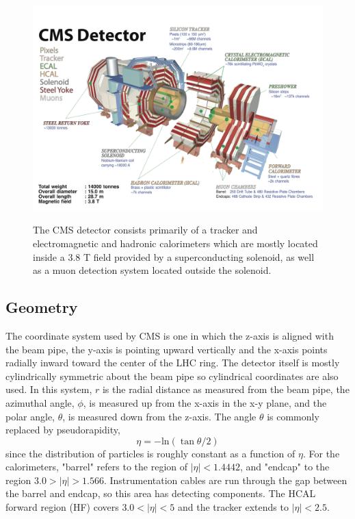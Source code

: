 \begin{figure}[tb]
\caption[The CMS Detector]{
 The CMS detector consists primarily of a tracker
  and electromagnetic and hadronic calorimeters
  which are mostly located inside a 3.8 T field provided
  by a superconducting solenoid,
  as well as a muon detection system located 
  outside the solenoid.
 }
\includegraphics[width=\textwidth]{pdfs/experiment/cms_explode.pdf}
\label{fig:cms_explode}
\end{figure}


 \subsection{Geometry} 
The coordinate system used by CMS is one in
 which the z-axis is aligned with the beam pipe,
 the y-axis is pointing upward vertically
 and the x-axis points radially inward toward the
 center of the LHC ring. 
The detector itself is mostly cylindrically symmetric
 about the beam pipe so cylindrical coordinates
 are also used.
In this system, $r$ is the radial distance
 as measured from the beam pipe, the azimuthal angle, $\phi$,
 is measured up from the x-axis in the x-y plane,
 and the polar angle, $\theta$, is measured
 down from the z-axis.
The angle $\theta$ is commonly replaced by pseudorapidity, 
\begin{equation}\label{eq:eta}
\eta = -\mathrm{ln}(\tan \theta/2)
\end{equation}
 since the distribution of particles
 is roughly constant as a function of $\eta$.
For the calorimeters, "barrel" refers to the region of $|\eta| < 1.4442$,
 and "endcap" to the region $3.0 > |\eta| > 1.566$.
Instrumentation cables are run through the
 gap between the barrel and endcap,
 so this area has detecting components. 
The HCAL forward region (HF) covers $3.0 < |\eta| < 5$ and
 the tracker extends to $|\eta| < 2.5$.

